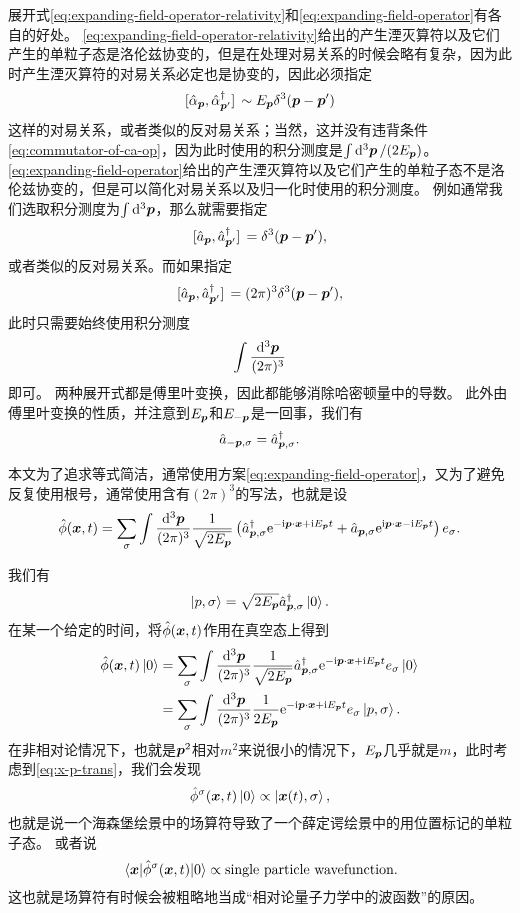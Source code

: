 \documentclass[hyperref, UTF8, a4paper]{ctexart}
\newcommand*{\ii}{\mathrm{i}}
\newcommand*{\ee}{\mathrm{e}}
\begin{document}
展开式\eqref{eq:expanding-field-operator-relativity}和\eqref{eq:expanding-field-operator}有各自的好处。
\eqref{eq:expanding-field-operator-relativity}给出的产生湮灭算符以及它们产生的单粒子态是洛伦兹协变的，但是在处理对易关系的时候会略有复杂，因为此时产生湮灭算符的对易关系必定也是协变的，因此必须指定
\[
    \comm*{\hat{\alpha}_{\vb*{p}}}{\hat{\alpha}^\dagger_{\vb*{p}'}} \sim E_{\vb*{p}} \delta^3 (\vb*{p} - \vb*{p}')
\]
这样的对易关系，或者类似的反对易关系；当然，这并没有违背条件\eqref{eq:commutator-of-ca-op}，因为此时使用的积分测度是$\int \dd[3]{\vb*{p}} / (2 E_{\vb*{p}})$。
\eqref{eq:expanding-field-operator}给出的产生湮灭算符以及它们产生的单粒子态不是洛伦兹协变的，但是可以简化对易关系以及归一化时使用的积分测度。
例如通常我们选取积分测度为$\int \dd[3]{\vb*{p}}$，那么就需要指定
\[
    \comm*{\hat{a}_{\vb*{p}}}{\hat{a}^\dagger_{\vb*{p}'}} = \delta^3 (\vb*{p} - \vb*{p}'),
\]
或者类似的反对易关系。而如果指定
\[
    \comm*{\hat{a}_{\vb*{p}}}{\hat{a}^\dagger_{\vb*{p}'}} = (2\pi)^3 \delta^3 (\vb*{p} - \vb*{p}'),
\]
此时只需要始终使用积分测度
\[
    \int \frac{\dd[3]{\vb*{p}}}{(2\pi)^3}
\]
即可。
两种展开式都是傅里叶变换，因此都能够消除哈密顿量中的导数。
此外由傅里叶变换的性质，并注意到$E_{\vb*{p}}$和$E_{-\vb*{p}}$是一回事，我们有
\begin{equation}
    \hat{a}_{-\vb*{p}, \sigma} = \hat{a}_{\vb*{p}, \sigma}^\dagger.
\end{equation}

本文为了追求等式简洁，通常使用方案\eqref{eq:expanding-field-operator}，又为了避免反复使用根号，通常使用含有$(2\pi)^3$的写法，也就是设
\begin{equation}
    \hat{\phi}(\vb*{x}, t) = \sum_\sigma \int \frac{\dd[3]{\vb*{p}}}{(2\pi)^3} \frac{1}{\sqrt{2 E_{\vb*{p}}}} \left( \hat{a}^\dagger_{\vb*{p}, \sigma} \ee^{- \ii \vb*{p} \cdot \vb*{x} + \ii E_{\vb*{p}} t} + \hat{a}_{\vb*{p}, \sigma} \ee^{\ii \vb*{p} \cdot \vb*{x} - \ii E_{\vb*{p}} t} \right) e_\sigma. 
    \label{eq:field-operator-fourier}
\end{equation}

我们有
\[
    \ket{p, \sigma} = \sqrt{2 E_{\vb*{p}}} \hat{a}^\dagger_{\vb*{p}, \sigma} \ket{0}.
\]
在某一个给定的时间，将$\hat{\phi}(\vb*{x}, t)$作用在真空态上得到
\[
    \begin{aligned}
        \hat{\phi}(\vb*{x}, t) \ket{0} &= \sum_\sigma \int \frac{\dd[3]{\vb*{p}}}{(2\pi)^3} \frac{1}{\sqrt{2 E_{\vb*{p}}}} \hat{a}^\dagger_{\vb*{p}, \sigma} \ee^{- \ii \vb*{p} \cdot \vb*{x} + \ii E_{\vb*{p}} t} e_{\sigma} \ket{0} \\
        &= \sum_\sigma \int \frac{\dd[3]{\vb*{p}}}{(2\pi)^3} \frac{1}{2 E_{\vb*{p}}} \ee^{- \ii \vb*{p} \cdot \vb*{x} + \ii E_{\vb*{p}} t} e_{\sigma} \ket{p, \sigma}.
    \end{aligned}
\]
在非相对论情况下，也就是$\vb*{p}^2$相对$m^2$来说很小的情况下，$E_{\vb*{p}}$几乎就是$m$，此时考虑到\eqref{eq:x-p-trans}，我们会发现
\[
    \hat{\phi}^\sigma (\vb*{x}, t) \ket{0} \propto \ket{\vb*{x}(t), \sigma},
\]
也就是说一个海森堡绘景中的场算符导致了一个薛定谔绘景中的用位置标记的单粒子态。
或者说
\[
    \mel{\vb*{x}}{\hat{\phi}^\sigma (\vb*{x}, t)}{0} \propto \text{single particle wavefunction}.
\]
这也就是场算符有时候会被粗略地当成“相对论量子力学中的波函数”的原因。
\end{document}
